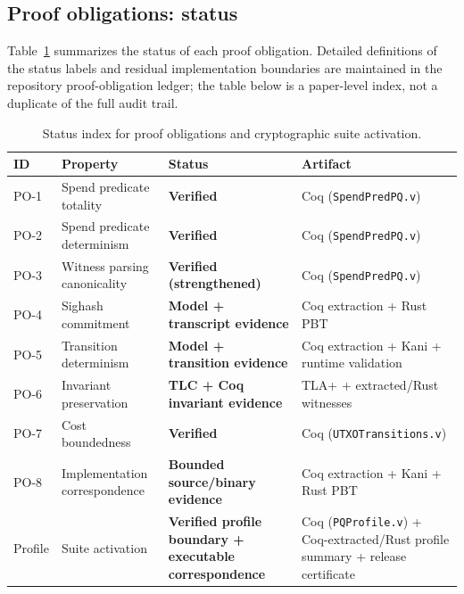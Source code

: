 \documentclass[11pt]{article}
\begin{document}
\subsection{Proof obligations: status}\label{sec:proof-obligations}

Table~\ref{tab:po-status} summarizes the status of each proof obligation.
Detailed definitions of the status labels and residual implementation boundaries
are maintained in the repository proof-obligation ledger; the table below is a
paper-level index, not a duplicate of the full audit trail.

\begin{table}[t]
\centering
\small
\begin{tabularx}{\textwidth}{@{}l>{\raggedright\arraybackslash}p{}>{\raggedright\arraybackslash}p{}X@{}}
\toprule
ID & Property & Status & Artifact \\
\midrule
PO-1 & Spend predicate totality & \textbf{Verified} & Coq (\texttt{SpendPredPQ.v}) \\
PO-2 & Spend predicate determinism & \textbf{Verified} & Coq (\texttt{SpendPredPQ.v}) \\
PO-3 & Witness parsing canonicality & \textbf{Verified (strengthened)} & Coq (\texttt{SpendPredPQ.v}) \\
PO-4 & Sighash commitment & \textbf{Model + transcript evidence} & Coq extraction + Rust PBT \\
PO-5 & Transition determinism & \textbf{Model + transition evidence} & Coq extraction + Kani + runtime validation \\
PO-6 & Invariant preservation & \textbf{TLC + Coq invariant evidence} & TLA+ + extracted/Rust witnesses \\
PO-7 & Cost boundedness & \textbf{Verified} & Coq (\texttt{UTXOTransitions.v}) \\
PO-8 & Implementation correspondence & \textbf{Bounded source/binary evidence} & Coq extraction + Kani + Rust PBT \\
Profile & Suite activation & \textbf{Verified profile boundary + executable correspondence} & Coq (\texttt{PQProfile.v}) + Coq-extracted/Rust profile summary + release certificate \\
\bottomrule
\end{tabularx}
\caption{Status index for proof obligations and cryptographic suite activation.}
\label{tab:po-status}
\end{table}
\end{document}
